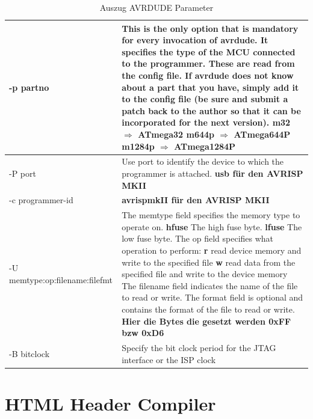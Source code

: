 \begin{table}
\begin{tabular}{| p{} | p{} |}
\hline
-p partno & This is the only option that is mandatory for every invocation of
avrdude.  It specifies the type of the MCU connected to the programmer. These
are read from the config file.  If avrdude does not know about a part that you
have, simply add it to the config file (be sure and submit a patch back to the
author so that it can be incorporated for the next version). \newline
\textbf{m32 $\Rightarrow$ ATmega32} \newline 
\textbf{m644p $\Rightarrow$ ATmega644P} \newline
\textbf{m1284p $\Rightarrow$ ATmega1284P} \\ \hline
-P port & Use port to identify the device to which the programmer is attached. \textbf{usb für den AVRISP MKII}  \\ \hline 
-c programmer-id & \textbf{avrispmkII für den AVRISP MKII} \\ \hline
-U \hbox{memtype:op:filename:filefmt} &  
The \textrm{memtype} field specifies the memory type to operate on.\newline
\textbf{hfuse} The high fuse byte.\newline
\textbf{lfuse} The low fuse byte.\newline
The \textrm{op} field specifies what operation to perform:\newline
\textbf{r} read device memory and write to the specified file\newline
\textbf{w} read data from the specified file and write to the device memory \newline
The filename field indicates the name of the file to read or write.  The format field is optional and contains the format of the file to read or write. \newline
\textbf{Hier die Bytes die gesetzt werden 0xFF bzw 0xD6} \\ \hline
-B bitclock & Specify the bit clock period for the \ac{JTAG} interface or the ISP clock \\ \hline
\end{tabular}
\caption{Auszug AVRDUDE Parameter}
\label{parameterAvrdude2}
\end{table}
\newpage

\section{HTML Header Compiler}
\label{chap:benutzerhandbuch.HHC}

